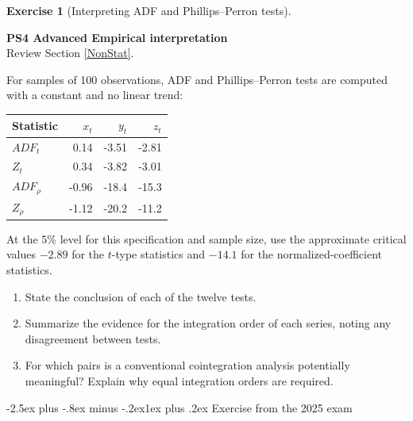 \documentclass[
  11pt,
]{book}
\makeatletter
\providecommand{\tightlist}{%
  \setlength{\itemsep}{0pt}\setlength{\parskip}{0pt}}
\renewcommand\subsection{\@startsection{subsection}{2}{\z@}
  {-2.5ex plus -.8ex minus -.2ex}{1ex plus .2ex}
  {\normalfont\large\bfseries\color{TextbookInk}}}
\theoremstyle{definition}
\theoremstyle{definition}
\theoremstyle{definition}
\newtheorem{exercise}{Exercise}[chapter]
\theoremstyle{definition}
\theoremstyle{remark}
\makeatother
\begin{document}
\begin{exercisebox}

\begin{exercise}[Interpreting ADF and Phillips–Perron tests]
\protect\hypertarget{exr:ex-unit-root-tests}{}\label{exr:ex-unit-root-tests}

\textbf{PS4 \textbar{} Advanced \textbar{} Empirical interpretation}\\
Review Section \ref{NonStat}.

For samples of 100 observations, ADF and Phillips--Perron tests are computed with a constant and no linear trend:

\begin{longtable}[]{@{}lrrr@{}}
\toprule\noalign{}
Statistic & \(x_t\) & \(y_t\) & \(z_t\) \\
\midrule\noalign{}
\endhead
\bottomrule\noalign{}
\endlastfoot
\(ADF_t\) & 0.14 & -3.51 & -2.81 \\
\(Z_t\) & 0.34 & -3.82 & -3.01 \\
\(ADF_\rho\) & -0.96 & -18.4 & -15.3 \\
\(Z_\rho\) & -1.12 & -20.2 & -11.2 \\
\end{longtable}

At the 5\% level for this specification and sample size, use the approximate critical values \(-2.89\) for the \(t\)-type statistics and \(-14.1\) for the normalized-coefficient statistics.

\begin{enumerate}
\def\labelenumi{\arabic{enumi}.}
\tightlist
\item
  State the conclusion of each of the twelve tests.
\item
  Summarize the evidence for the integration order of each series, noting any disagreement between tests.
\item
  For which pairs is a conventional cointegration analysis potentially meaningful? Explain why equal integration orders are required.
\end{enumerate}

\end{exercise}

\end{exercisebox}

\subsection{Exercise from the 2025 exam}\label{exercise-from-the-2025-exam-1}
\end{document}
